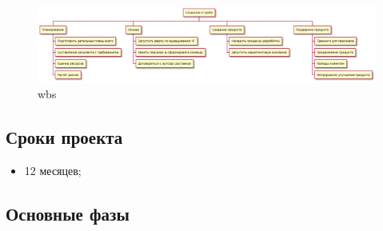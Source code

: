 \documentclass[a4paper,10pt]{article}
\begin{document}
    \begin{figure}[h]
        \centering
        \includegraphics[width=1\textwidth]{./pics/wbs.pdf}
        \caption{wbs}
    \end{figure}

\subsection{Сроки проекта}

    \begin{itemize}
        \item 12 месяцев;
    \end{itemize}

\subsection{Основные фазы}
\end{document}
